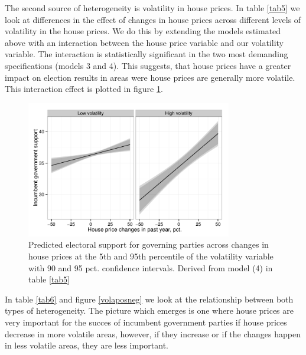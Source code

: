 \documentclass[12pt,a4paper]{article}
\begin{document}
The second source of heterogeneity is volatility in house prices. In table \ref{tab5} we look at differences in the effect of changes in house prices across different levels of volatility in the house prices.  We do this by extending the models estimated above with an interaction between the house price variable and our volatility variable. The interaction is statistically significant in the two most demanding specifications (models 3 and 4). This suggests, that house prices have a greater impact on election results in areas were house prices are generally more volatile. This interaction effect is plotted in figure \ref{vola}.



\begin{figure}[htbp]
	\includegraphics[page=1,width=0.8\textwidth]{../figures/volaplot}
	\centering
	\caption{Predicted electoral support for governing parties across changes in house prices at the 5th and 95th percentile of the volatility variable with 90 and 95 pct. confidence intervals. Derived from model (4) in table \ref{tab5}}
	\label{vola}
\end{figure}


In table \ref{tab6} and figure \ref{volaposneg} we look at the relationship between both types of heterogeneity. The picture which emerges is one where house prices are very important for the succes of incumbent government parties if house prices decrease in more volatile areas, however, if they increase or if the changes happen in less volatile areas, they are less important.




\end{document}
